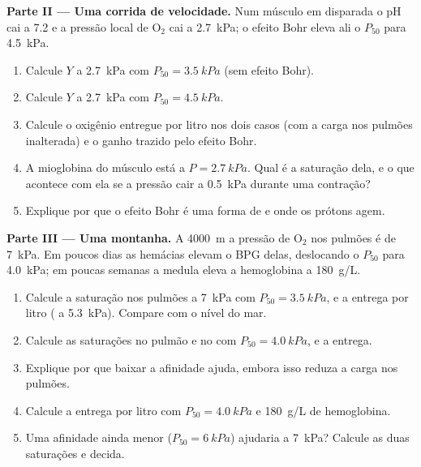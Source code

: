 \begin{problem}
\medskip
\noindent\textbf{Parte II --- Uma corrida de velocidade.}
Num músculo em disparada o pH cai a 7.2 e a pressão local de
$\mathrm{O_2}$ cai a \qty{2.7}{kPa}; o efeito Bohr eleva ali o $P_{50}$
para \qty{4.5}{kPa}.
\begin{enumerate}[resume]
  \item Calcule $Y$ a \qty{2.7}{kPa} com $P_{50} = \qty{3.5}{kPa}$ (sem
        efeito Bohr).
  \item Calcule $Y$ a \qty{2.7}{kPa} com $P_{50} = \qty{4.5}{kPa}$.
  \item Calcule o oxigênio entregue por litro nos dois casos (com a
        carga nos pulmões inalterada) e o ganho trazido pelo efeito
        Bohr.
  \item A mioglobina do músculo está a $P = \qty{2.7}{kPa}$. Qual é a
        saturação dela, e o que acontece com ela se a pressão cair a
        \qty{0.5}{kPa} durante uma contração?
  \item Explique por que o efeito Bohr é uma forma de  e onde
        os prótons agem.
\end{enumerate}

\medskip
\noindent\textbf{Parte III --- Uma montanha.}
A \qty{4000}{m} a pressão de $\mathrm{O_2}$ nos pulmões é de
\qty{7}{kPa}. Em poucos dias as hemácias elevam o BPG delas, deslocando
o $P_{50}$ para \qty{4.0}{kPa}; em poucas semanas a medula eleva a
hemoglobina a \qty{180}{g/L}.
\begin{enumerate}[resume]
  \item Calcule a saturação nos pulmões a \qty{7}{kPa} com
        $P_{50} = \qty{3.5}{kPa}$, e a entrega por litro ( a
        \qty{5.3}{kPa}). Compare com o nível do mar.
  \item Calcule as saturações no pulmão e no  com
        $P_{50} = \qty{4.0}{kPa}$, e a entrega.
  \item Explique por que baixar a afinidade ajuda, embora isso reduza a
        carga nos pulmões.
  \item Calcule a entrega por litro com $P_{50} = \qty{4.0}{kPa}$ e
        \qty{180}{g/L} de hemoglobina.
  \item Uma afinidade ainda menor ($P_{50} = \qty{6}{kPa}$) ajudaria a
        \qty{7}{kPa}? Calcule as duas saturações e decida.
\end{enumerate}


\end{problem}
